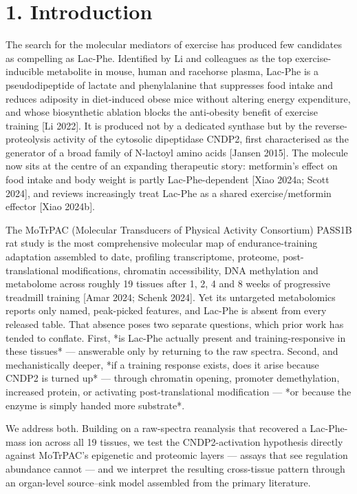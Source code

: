 \documentclass[11pt]{article}
\begin{document}
\section*{1. Introduction}

The search for the molecular mediators of exercise has produced few candidates as
compelling as Lac-Phe. Identified by Li and colleagues as the top exercise-inducible
metabolite in mouse, human and racehorse plasma, Lac-Phe is a pseudodipeptide of
lactate and phenylalanine that suppresses food intake and reduces adiposity in
diet-induced obese mice without altering energy expenditure, and whose biosynthetic
ablation blocks the anti-obesity benefit of exercise training [Li 2022]. It is produced
not by a dedicated synthase but by the reverse-proteolysis activity of the cytosolic
dipeptidase CNDP2, first characterised as the generator of a broad family of N-lactoyl
amino acids [Jansen 2015]. The molecule now sits at the centre of an expanding
therapeutic story: metformin's effect on food intake and body weight is partly
Lac-Phe-dependent [Xiao 2024a; Scott 2024], and reviews increasingly treat Lac-Phe as a
shared exercise/metformin effector [Xiao 2024b].

The MoTrPAC (Molecular Transducers of Physical Activity Consortium) PASS1B rat study is
the most comprehensive molecular map of endurance-training adaptation assembled to date,
profiling transcriptome, proteome, post-translational modifications, chromatin
accessibility, DNA methylation and metabolome across roughly 19 tissues after 1, 2, 4
and 8 weeks of progressive treadmill training [Amar 2024; Schenk 2024]. Yet its
untargeted metabolomics reports only named, peak-picked features, and Lac-Phe is absent
from every released table. That absence poses two separate questions, which prior work
has tended to conflate. First, *is Lac-Phe actually present and training-responsive in
these tissues* --- answerable only by returning to the raw spectra. Second, and
mechanistically deeper, *if a training response exists, does it arise because CNDP2 is
turned up* --- through chromatin opening, promoter demethylation, increased protein, or
activating post-translational modification --- *or because the enzyme is simply handed
more substrate*.

We address both. Building on a raw-spectra reanalysis that recovered a Lac-Phe-mass ion
across all 19 tissues, we test the CNDP2-activation hypothesis directly against MoTrPAC's
epigenetic and proteomic layers --- assays that see regulation abundance cannot --- and we
interpret the resulting cross-tissue pattern through an organ-level source--sink model
assembled from the primary literature.
\end{document}
